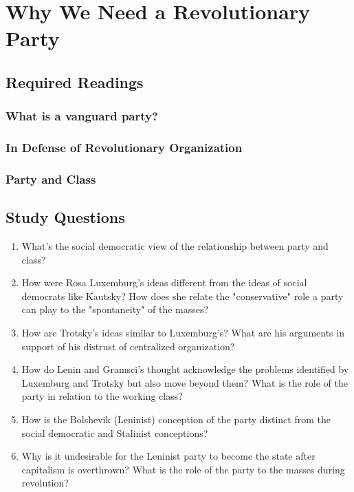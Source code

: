 \documentclass[12pt,a4paper]{report}
\begin{document}
\chapter{Why We Need a Revolutionary Party}
\section{Required Readings}
\subsection{What is a vanguard party?}

\clearpage

\subsection{In Defense of Revolutionary Organization}

\clearpage

\subsection{Party and Class}

\clearpage

\section{Study Questions}
\begin{enumerate}
	\item What's the social democratic view of the relationship between party and class?
	\item How were Rosa Luxemburg's ideas different from the ideas of social democrats like Kautsky? How does she relate the "conservative" role a party can play to the "spontaneity" of the masses?
	\item How are Trotsky's ideas similar to Luxemburg's? What are his arguments in support of his distrust of centralized organization?
	\item How do Lenin and Gramsci's thought acknowledge the problems identified by Luxemburg and Trotsky but also move beyond them? What is the role of the party in relation to the working class?
	\item How is the Bolshevik (Leninist) conception of the party distinct from the social democratic and Stalinist conceptions?
	\item Why is it undesirable for the Leninist party to become the state after capitalism is overthrown? What is the role of the party to the masses during revolution?
\end{enumerate}
\clearpage
\end{document}
